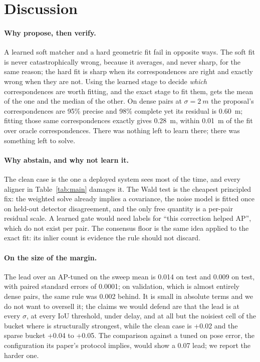 \section{Discussion}
\label{sec:discussion}

\paragraph{Why propose, then verify.}
A learned soft matcher and a hard geometric fit fail in opposite ways. The soft fit is never catastrophically wrong, because it averages, and never sharp, for the same reason; the hard fit is sharp when its correspondences are right and exactly wrong when they are not. Using the learned stage to decide \emph{which} correspondences are worth fitting, and the exact stage to fit them, gets the mean of the one and the median of the other. On dense \vxreal pairs at $\sigma=\SI{2}{m}$ the proposal's correspondences are 95\% precise and 98\% complete yet its residual is \SI{0.60}{m}; fitting those same correspondences exactly gives \SI{0.28}{m}, within \SI{0.01}{m} of the fit over oracle correspondences. There was nothing left to learn there; there was something left to solve.

\paragraph{Why abstain, and why not learn it.}
The clean case is the one a deployed system sees most of the time, and every aligner in Table~\ref{tab:main} damages it. The Wald test is the cheapest principled fix: the weighted solve already implies a covariance, the noise model is fitted once on held-out detector disagreement, and the only free quantity is a per-pair residual scale. A learned gate would need labels for ``this correction helped AP'', which do not exist per pair. The consensus floor is the same idea applied to the exact fit: its inlier count is evidence the rule should not discard.

\paragraph{On the size of the margin.}
The lead over an AP-tuned \freealign on the sweep mean is 0.014  on \vxreal test and 0.009 on \opvv test, with paired standard errors of 0.0001; on \opvv validation, which is almost entirely dense pairs, the same rule was 0.002 behind. It is small in absolute terms and we do not want to oversell it; the claims we would defend are that the lead is at every $\sigma$, at every IoU threshold, under delay, and at all but the noisiest cell of the bucket where \freealign is structurally strongest, while the clean case is +0.02 and the sparse bucket +0.04 to +0.05. The comparison against a \freealign tuned on pose error, the configuration its paper's protocol implies, would show a 0.07 lead; we report the harder one.

